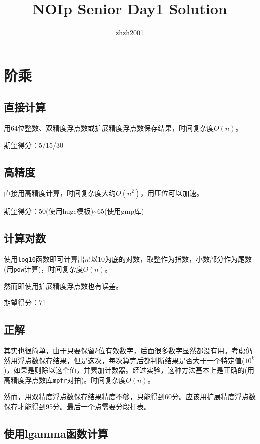 \documentclass[hyperref,UTF8,12pt,a4paper]{ctexart}
\title{NOIp Senior Day1 Solution}
\author{zhzh2001}
\date{}
\begin{document}
\maketitle

\section{阶乘}

\subsection{直接计算}

用64位整数、双精度浮点数或扩展精度浮点数保存结果，时间复杂度$O(n)$。

期望得分：5/15/30

\subsection{高精度}

直接用高精度计算，时间复杂度大约$O(n^2)$，用压位可以加速。

期望得分：50(使用huge模板)\textasciitilde{}65(使用gmp库)

\subsection{计算对数}

使用\verb|log10|函数即可计算出$n!$以10为底的对数，取整作为指数，小数部分作为尾数(用\verb|pow|计算)，时间复杂度$O(n)$。

然而即使用扩展精度浮点数也有误差。

期望得分：71

\subsection{正解}

其实也很简单，由于只要保留$k$位有效数字，后面很多数字显然都没有用。考虑仍然用浮点数保存结果，但是这次，每次算完后都判断结果是否大于一个特定值($10^k$)，如果是则除以这个值，并累加计数器。经过实验，这种方法基本上是正确的(用高精度浮点数库\verb|mpfr|对拍)。时间复杂度$O(n)$。

然而，用双精度浮点数保存结果精度不够，只能得到60分。应该用扩展精度浮点数保存才能得到95分。最后一个点需要分段打表。

\subsection{使用lgamma函数计算}
\end{document}
